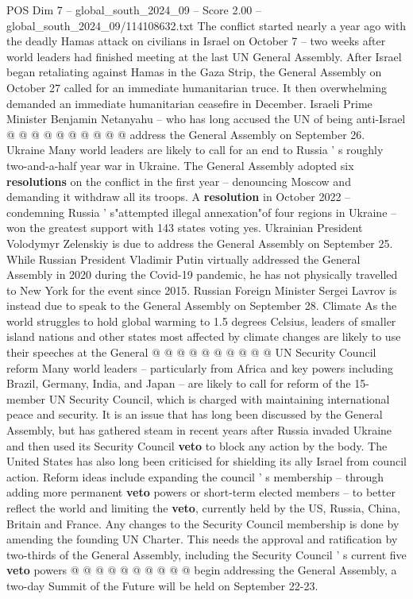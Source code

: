 \begin{textsample}{POS Dim 7 – global\_south\_2024\_09 – Score 2.00 – global\_south\_2024\_09/114108632.txt}
The conflict started nearly a year ago with the deadly Hamas attack on civilians in Israel on October 7 -- two weeks after world leaders had finished meeting at the last UN General Assembly.
After Israel began retaliating against Hamas in the Gaza Strip, the General Assembly on October 27 called for an immediate humanitarian truce.
It then overwhelming demanded an immediate humanitarian ceasefire in December.
Israeli Prime Minister Benjamin Netanyahu -- who has long accused the UN of being anti-Israel @ @ @ @ @ @ @ @ @ @ address the General Assembly on September 26.
Ukraine Many world leaders are likely to call for an end to Russia ' s roughly two-and-a-half year war in Ukraine.
The General Assembly adopted six \textbf{resolutions} on the conflict in the first year -- denouncing Moscow and demanding it withdraw all its troops.
A \textbf{resolution} in October 2022 -- condemning Russia ' s"attempted illegal annexation"of four regions in Ukraine -- won the greatest support with 143 states voting yes.
Ukrainian President Volodymyr Zelenskiy is due to address the General Assembly on September 25.
While Russian President Vladimir Putin virtually addressed the General Assembly in 2020 during the Covid-19 pandemic, he has not physically travelled to New York for the event since 2015.
Russian Foreign Minister Sergei Lavrov is instead due to speak to the General Assembly on September 28.
Climate As the world struggles to hold global warming to 1.5 degrees Celsius, leaders of smaller island nations and other states most affected by climate changes are likely to use their speeches at the General @ @ @ @ @ @ @ @ @ @ UN Security Council reform Many world leaders -- particularly from Africa and key powers including Brazil, Germany, India, and Japan -- are likely to call for reform of the 15-member UN Security Council, which is charged with maintaining international peace and security.
It is an issue that has long been discussed by the General Assembly, but has gathered steam in recent years after Russia invaded Ukraine and then used its Security Council \textbf{veto} to block any action by the body.
The United States has also long been criticised for shielding its ally Israel from council action.
Reform ideas include expanding the council ' s membership -- through adding more permanent \textbf{veto} powers or short-term elected members -- to better reflect the world and limiting the \textbf{veto}, currently held by the US, Russia, China, Britain and France.
Any changes to the Security Council membership is done by amending the founding UN Charter.
This needs the approval and ratification by two-thirds of the General Assembly, including the Security Council ' s current five \textbf{veto} powers @ @ @ @ @ @ @ @ @ @ begin addressing the General Assembly, a two-day Summit of the Future will be held on September 22-23.

\end{textsample}

